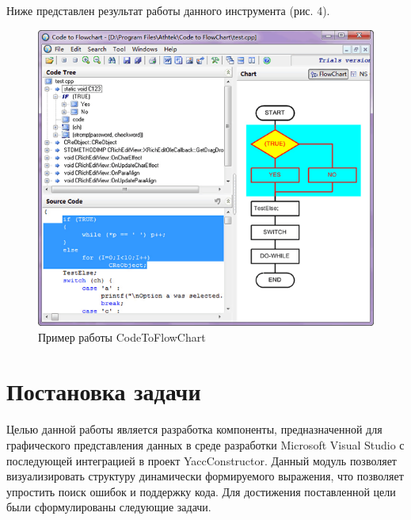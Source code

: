 \documentclass{matmex-diploma}
\begin{document}
Ниже представлен результат работы данного инструмента (рис. 4).
\begin{figure}[h]
\label{CodeVisual}
\centering
\includegraphics[width=\textwidth]{CodeToFlowChart.png}
\caption{Пример работы CodeToFlowChart}
\end{figure}


\newpage{}
\section{Постановка задачи}
    Целью данной работы является разработка компоненты, предназначенной для графического представления данных в среде разработки  Microsoft Visual Studio с последующей интеграцией в проект YaccConstructor. Данный модуль позволяет визуализировать структуру динамически формируемого выражения, что позволяет упростить поиск ошибок и поддержку кода. 
Для достижения поставленной цели были сформулированы следующие задачи.
\end{document}
